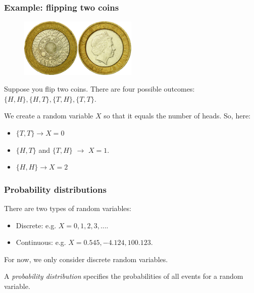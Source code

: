 \documentclass{beamer}
\begin{document}
	\begin{frame}
		\frametitle{Example: flipping two coins}
		
		\begin{figure}[ht]
			\includegraphics[width=0.5\textwidth]{./figures/coins.jpeg}
		\end{figure}
		
		Suppose you flip two coins. There are four possible outcomes: $\{H,H\}, \{H,T\}, \{T,H\}, \{T,T\}$.
		
		\vspace{0.5cm}
		
		We create a random variable $X$ so that it equals the number of heads. So, here:
		
		\begin{itemize}
			\item $\{T,T\}\rightarrow X=0$
			\item $\{H,T\}$ and $\{T,H\}$ $\rightarrow$ $X=1$.
			\item $\{H,H\} \rightarrow X=2$
		\end{itemize}
		
	\end{frame}
	
	\begin{frame}
		\frametitle{Probability distributions}
		
		There are two types of random variables:
		
		\begin{itemize}
			\item Discrete: e.g. $X=0, 1, 2, 3, ...$.
			\item Continuous: e.g. $X=0.545, -4.124, 100.123$.
		\end{itemize}
		
		For now, we only consider discrete random variables.
		
		\vspace{0.5cm}
		
		A \textit{probability distribution} specifies the probabilities of all events for a random variable.
		
	\end{frame}
	
\end{document}
